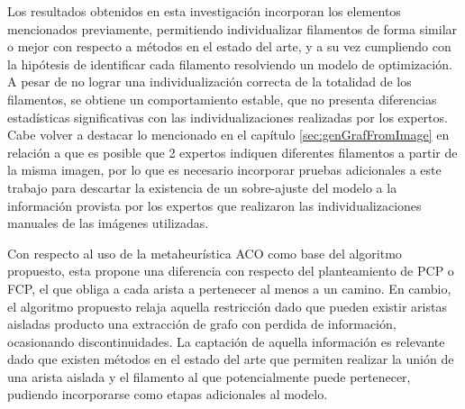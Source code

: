 Los resultados obtenidos en esta investigaci\'on incorporan los elementos mencionados previamente, permitiendo individualizar filamentos de forma similar o mejor con respecto a m\'etodos en el estado del arte, y a su vez cumpliendo con la hip\'otesis de identificar cada filamento resolviendo un modelo de optimizaci\'on. A pesar de no lograr una individualizaci\'on correcta de la totalidad de los filamentos, se obtiene un comportamiento estable, que no presenta diferencias estad\'isticas significativas con las individualizaciones realizadas por los expertos. Cabe volver a destacar lo mencionado en el cap\'itulo \ref{sec:genGrafFromImage} en relaci\'on a que es posible que 2 expertos indiquen diferentes filamentos a partir de la misma imagen, por lo que es necesario incorporar pruebas adicionales a este trabajo para descartar la existencia de un sobre-ajuste del modelo a la informaci\'on provista por los expertos que realizaron las individualizaciones manuales de las im\'agenes utilizadas.


Con respecto al uso de la metaheur\'istica ACO como base del algoritmo propuesto, esta propone una diferencia con respecto del planteamiento de PCP o FCP, el que obliga a cada arista a pertenecer al menos a un camino. En cambio, el algoritmo propuesto relaja aquella restricci\'on dado que pueden existir aristas aisladas producto una extracci\'on de grafo con perdida de informaci\'on, ocasionando discontinuidades. La captaci\'on de aquella informaci\'on es relevante dado que existen m\'etodos en el estado del arte que permiten realizar la uni\'on de una arista aislada y el filamento al que potencialmente puede pertenecer, pudiendo incorporarse como etapas adicionales al modelo. 

